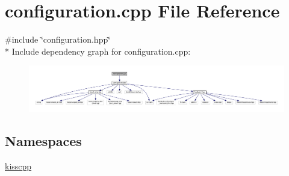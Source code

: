 \hypertarget{a00052}{\section{configuration.\-cpp File Reference}
\label{a00052}
}
{\ttfamily \#include \char`\"{}configuration.\-hpp\char`\"{}}\\*
Include dependency graph for configuration.\-cpp\-:\nopagebreak
\begin{figure}[H]
\begin{center}
\leavevmode
\includegraphics[width=350pt]{a00098}
\end{center}
\end{figure}
\subsection*{Namespaces}
\begin{DoxyCompactItemize}
\item 
\hyperlink{a00089}{kisscpp}
\end{DoxyCompactItemize}
